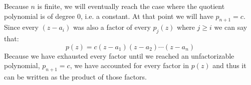 \documentclass{article}
\begin{document}
Because $n$ is finite, we will eventually reach the case where the quotient polynomial is of degree 0, i.e. a constant. At that point we will have $p_{n+1}=c$. Since every $(z-a_i)$ was also a factor of every $p_j(z)$ where $j\ge i$ we can say that:
$$p(z)=c(z-a_1)(z-a_2)\cdots(z-a_n)$$
Because we have exhausted every factor until we reached an unfactorizable polynomial, $p_{n+1}=c$, we have accounted for every factor in $p(z)$ and thus it can be written as the product of those factors.
\end{document}
